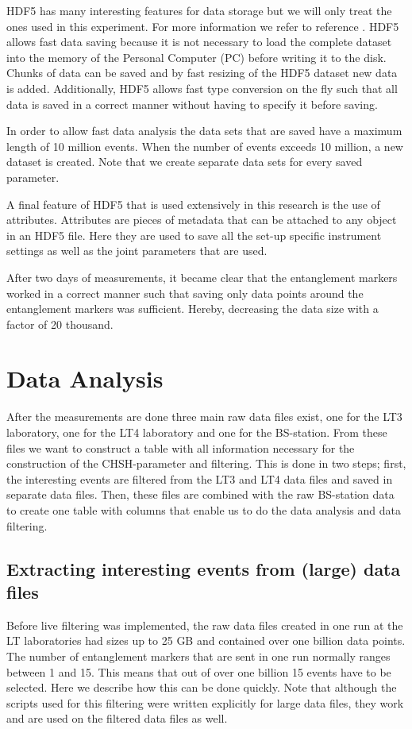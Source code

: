 HDF5 has many interesting features for data storage but we will only treat the ones used in this experiment. For more information we refer to reference \cite{collette2013python}. HDF5 allows fast data saving because it is not necessary to load the complete dataset into the memory of the Personal Computer (PC) before writing it to the disk. Chunks of data can be saved and by fast resizing of the HDF5 dataset new data is added. Additionally, HDF5 allows fast type conversion on the fly such that all data is saved in a correct manner without having to specify it before saving. 

In order to allow fast data analysis the data sets that are saved have a maximum length of 10 million events. When the number of events exceeds 10 million, a new dataset is created. Note that we create separate data sets for every saved parameter.

A final feature of HDF5 that is used extensively in this research is the use of attributes. Attributes are pieces of metadata that can be attached to any object in an HDF5 file. Here they are used to save all the set-up specific instrument settings as well as the joint parameters that are used. 

After two days of measurements, it became clear that the entanglement markers worked in a correct manner such that saving only data points around the entanglement markers was sufficient. Hereby, decreasing the data size with a factor of 20 thousand. 

\color{tudelft-cyan}
\section{Data Analysis}
\label{data_analysis}
\color{black}
After the measurements are done three main raw data files exist, one for the LT3 laboratory, one for the LT4 laboratory and one for the BS-station. From these files we want to construct a table with all information necessary for the construction of the CHSH-parameter and filtering. This is done in two steps; first, the interesting events are filtered from the LT3 and LT4 data files and saved in separate data files. Then, these files are combined with the raw BS-station data to create one table with columns that enable us to do the data analysis and data filtering. 

\color{tudelft-cyan}
\subsection{Extracting interesting events from (large) data files}
\label{large_data_files}
\color{black}
Before live filtering was implemented, the raw data files created in one run at the LT laboratories had sizes up to 25 GB and contained over one billion data points. The number of entanglement markers that are sent in one run normally ranges between 1 and 15. This means that out of over one billion 15 events have to be selected. Here we describe how this can be done quickly. Note that although the scripts used for this filtering were written explicitly for large data files, they work and are used on the filtered data files as well.

